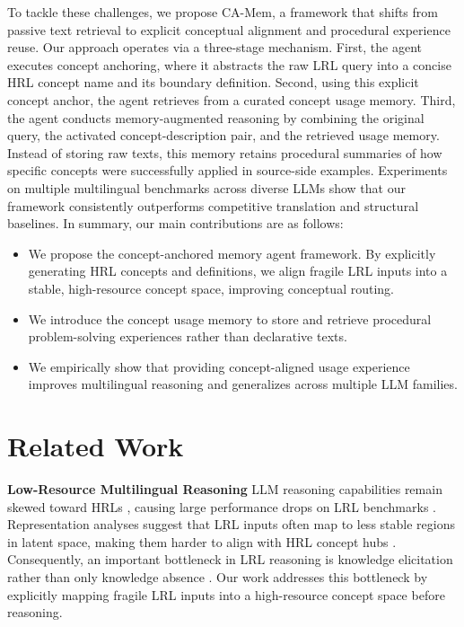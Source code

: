 \documentclass[11pt]{article}
\begin{document}
To tackle these challenges, we propose CA-Mem, a framework that shifts from passive text retrieval to explicit conceptual alignment and procedural experience reuse.
Our approach operates via a three-stage mechanism.
First, the agent executes concept anchoring, where it abstracts the raw LRL query into a concise HRL concept name and its boundary definition.
Second, using this explicit concept anchor, the agent retrieves from a curated concept usage memory.
Third, the agent conducts memory-augmented reasoning by combining the original query, the activated concept-description pair, and the retrieved usage memory.
Instead of storing raw texts, this memory retains procedural summaries of how specific concepts were successfully applied in source-side examples.
Experiments on multiple multilingual benchmarks across diverse LLMs show that our framework consistently outperforms competitive translation and structural baselines.
In summary, our main contributions are as follows:
\begin{itemize}
    \item We propose the concept-anchored memory agent framework.
    By explicitly generating HRL concepts and definitions, we align fragile LRL inputs into a stable, high-resource concept space, improving conceptual routing.
    \item We introduce the concept usage memory to store and retrieve procedural problem-solving experiences rather than declarative texts.
    \item We empirically show that providing concept-aligned usage experience improves multilingual reasoning and generalizes across multiple LLM families.
\end{itemize}

\section{Related Work}

\textbf{Low-Resource Multilingual Reasoning}
LLM reasoning capabilities remain skewed toward HRLs \citep{huang2023not,zhu2024multilingual}, causing large performance drops on LRL benchmarks \citep{shi2022language,ponti2020xcopa}.
Representation analyses suggest that LRL inputs often map to less stable regions in latent space, making them harder to align with HRL concept hubs \citep{cao2024exploring,tang2024language}.
Consequently, an important bottleneck in LRL reasoning is knowledge elicitation rather than only knowledge absence \citep{qin2024does}.
Our work addresses this bottleneck by explicitly mapping fragile LRL inputs into a high-resource concept space before reasoning.
\end{document}
